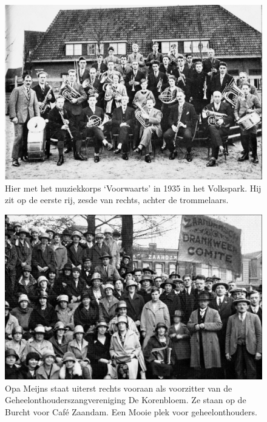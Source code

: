 \documentclass[10pt,twoside, openright]{memoir}
\begin{document}
\begin{figure}
\includegraphics[width=\textwidth]{img/ch2/ch2-afb04}
\caption*{\footnotesize Hier met het muziekkorps `Voorwaarts' in 1935 in het Volkspark. Hij zit op de eerste rij, zesde van rechts, achter de trommelaars.}
\end{figure}

\begin{figure}
\includegraphics[width=\textwidth]{img/14OpaMeijns7}
\caption*{\footnotesize Opa Meijns staat uiterst rechts vooraan als voorzitter van de Geheelonthouderszangvereniging De Korenbloem. Ze staan op de Burcht voor Café Zaandam. Een Mooie plek voor geheelonthouders.}
\end{figure}
\end{document}
